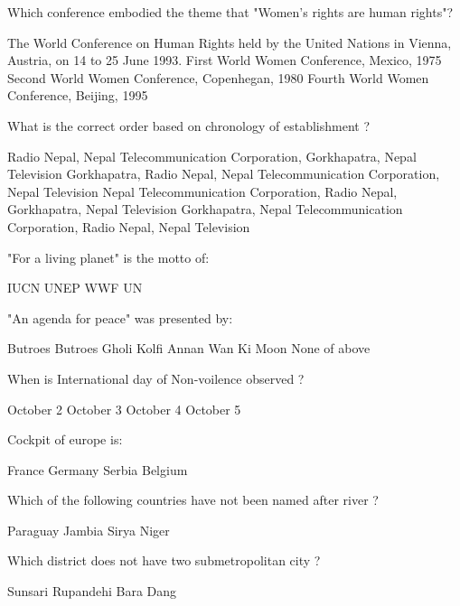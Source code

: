 \begin{questions}
\question Which conference embodied the theme that "Women's rights are human rights"?
  \begin{choices}
  \choice The World Conference on Human Rights held by the United Nations in Vienna, Austria, on 14 to 25 June 1993.
  \choice First World Women Conference, Mexico, 1975
  \choice Second World Women Conference, Copenhegan, 1980
  \choice Fourth World Women Conference, Beijing, 1995
  \end{choices}

\question What is the correct order based on chronology of establishment ?
  \begin{choices}
  \choice Radio Nepal, Nepal Telecommunication Corporation, Gorkhapatra, Nepal Television
  \CorrectChoice Gorkhapatra, Radio Nepal, Nepal Telecommunication Corporation, Nepal Television
  \choice Nepal Telecommunication Corporation, Radio Nepal, Gorkhapatra, Nepal Television
  \choice Gorkhapatra, Nepal Telecommunication Corporation, Radio Nepal, Nepal Television
  \end{choices}

\question "For a living planet" is the motto of:
  \begin{choices}
  \choice IUCN
  \choice UNEP
  \CorrectChoice WWF
  \choice UN
  \end{choices}

\question "An agenda for peace" was presented by:
  \begin{choices}
  \CorrectChoice Butroes Butroes Gholi
  \choice Kolfi Annan
  \choice Wan Ki Moon
  \choice None of above
  \end{choices}

\question When is International day of Non-voilence observed ?
  \begin{choices}
  \CorrectChoice October 2
  \choice October 3
  \choice October 4
  \choice October 5
  \end{choices}

\question Cockpit of europe is:
  \begin{choices}
  \choice France
  \choice Germany
  \choice Serbia
  \CorrectChoice Belgium
  \end{choices}

\question Which of the following countries have not been named after river ?
  \begin{choices}
  \choice Paraguay
  \choice Jambia
  \CorrectChoice Sirya
  \choice Niger
  \end{choices}

\question Which district does not have two submetropolitan city ?
  \begin{choices}
  \choice Sunsari
  \CorrectChoice Rupandehi
  \choice Bara
  \choice Dang
  \end{choices}


\end{questions}
